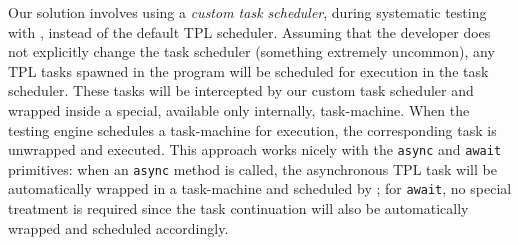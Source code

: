 Our solution involves using a \emph{custom task scheduler}, during systematic testing with \psharp, instead of the default TPL scheduler. Assuming that the developer does not explicitly change the task scheduler (something extremely uncommon), any TPL tasks spawned in the \psharp program will be scheduled for execution in the \psharp task scheduler. These tasks will be intercepted by our custom task scheduler and wrapped inside a special, available only internally, task-machine. When the \psharp testing engine schedules a task-machine for execution, the corresponding task is unwrapped and executed. This approach works nicely with the \texttt{async} and \texttt{await}  primitives: when an \texttt{async} method is called, the asynchronous TPL task will be automatically wrapped in a task-machine and scheduled by \psharp; for \texttt{await}, no special treatment is required since the task continuation will also be automatically wrapped and scheduled accordingly.
